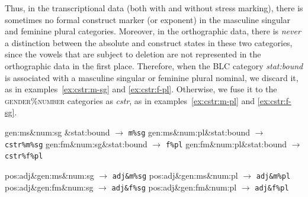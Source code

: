\begin{description}
Thus, in the transcriptional data (both with and without stress marking), there 
is sometimes no formal construct marker (or exponent) in the masculine singular 
and feminine plural categories. 
Moreover, in the orthographic data, there is \emph{never} a distinction between 
the absolute and construct states in these 
two categories, since the vowels that are subject to deletion are not represented in the 
orthographic data in the first place.
Therefore, when the BLC category \textit{stat:bound}  is associated with a masculine singular or feminine plural nominal, we discard it, as in examples~\ref{ex:cstr:m-sg} and \ref{ex:cstr:f-pl}. Otherwise, we fuse it to the \textsc{gender}\%\textsc{number} categories as \textit{cstr}, as in examples~\ref{ex:cstr:m-pl} and \ref{ex:cstr:f-sg}.
\begin{exe}
\ex \label{ex:cstr-cats} 
\begin{xlist}
		\ex gen:ms\&num:sg \&stat:bound \quad $\to$ \quad \texttt{m\%sg} \label{ex:cstr:m-sg}
		\ex gen:ms\&num:pl\&stat:bound \quad $\to$ \quad \texttt{cstr\%m\%sg} \label{ex:cstr:m-pl}
		\ex gen:fm\&num:sg\&stat:bound  \quad $\to$ \quad \texttt{f\%pl} \label{ex:cstr:f-sg}
		\ex gen:fm\&num:pl\&stat:bound \quad $\to$ \quad \texttt{cstr\%f\%pl} \label{ex:cstr:f-pl}
	\end{xlist}
\ex \label{ex:adj-cats} 
\begin{xlist}
		\ex pos:adj\&gen:ms\&num:sg \quad $\to$ \quad \texttt{adj\&m\%sg} \label{ex:adj:m-sg}
		\ex pos:adj\&gen:ms\&num:pl \quad $\to$ \quad \texttt{adj\&m\%pl} \label{ex:adj:m-pl}
		\ex pos:adj\&gen:fm\&num:sg \quad $\to$ \quad \texttt{adj\&f\%sg} \label{ex:adj:f-sg}
		\ex pos:adj\&gen:fm\&num:pl \quad $\to$ \quad \texttt{adj\&f\%pl} \label{ex:adj:f-pl}
	\end{xlist}
\end{exe}


\end{description}
